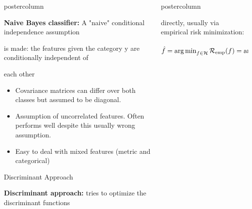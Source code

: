 \documentclass{beamer}
\begin{document}
\begin{frame}[fragile]{}
\begin{columns}
\begin{column}{.31\textwidth}
\begin{beamercolorbox}[center]{postercolumn}
\begin{minipage}{.98\textwidth}
{\begin{myblock}{}
  \vspace*{1ex}
  
  \begin{codebox}
  \textbf{Naive Bayes classifier: }A "naive" conditional independence assumption
  \end{codebox}

  \begin{codebox}
  is made: the features given the category y are conditionally independent of
  \end{codebox}
  
  \begin{codebox}
  each other
  \end{codebox}
  
  \begin{itemize}[$\bullet$]
    \setlength{\itemindent}{+.3in}
      \item Covariance matrices can differ over both classes but assumed to be diagonal.
      \item Assumption of uncorrelated features. Often performs well despite this usually wrong assumption.
      \item Easy to deal with mixed features (metric and categorical)
  \end{itemize}
  \end{myblock}
  
  \begin{myblock}{Discriminant Approach}
  \begin{codebox}
  \textbf{Discriminant approach: }tries to optimize the discriminant functions
  \end{codebox}
  \end{myblock}
  }
  \end{minipage}
		\end{beamercolorbox}
	\end{column}
	
	
	\begin{column}{.31\textwidth}
	\begin{beamercolorbox}[center]{postercolumn}
	
	\begin{minipage}{.98\textwidth}
  \parbox[t][\columnheight]{\textwidth}{
  \begin{myblock}{}
    
  \begin{codebox}
  directly, usually via empirical risk minimization:
  \end{codebox}
    
  $ \hat{f} = \mathop{\mathrm{arg\,min}}_{f \in \mathcal{H}} \mathcal{R}_{\text{emp}}(f) = \mathop{\mathrm{arg\,min}}_{f \in \mathcal{H}} \sum\limits_{i=1}^n L\left(y^{(i)}, f\left(\mathbf{x}^{(i)}\right)\right).$
  

\end{myblock}}
\end{minipage}
\end{beamercolorbox}
\end{column}
\end{columns}
\end{frame}
\end{document}
